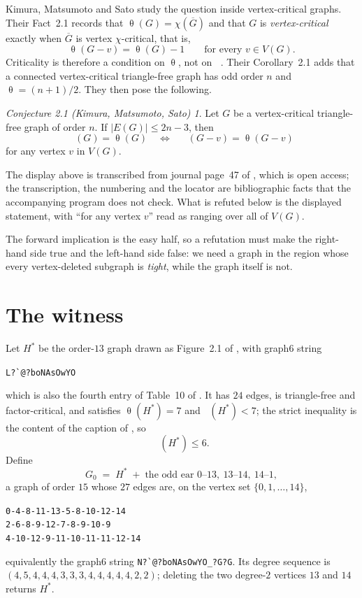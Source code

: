 \documentclass[11pt]{amsart}
\theoremstyle{remark}
\newtheorem*{conjKMS}{Conjecture 2.1 (Kimura, Matsumoto, Sato)}
\DeclareMathOperator{\edom}{\gamma^{\infty}}
\DeclareMathOperator{\thet}{\theta}
\newcommand{\Gz}{G_0}
\newcommand{\Hs}{H^{*}}
\begin{document}
Kimura, Matsumoto and Sato \cite{KMS} study the question inside vertex-critical graphs. Their
Fact~2.1 records that $\thet(G)=\chi(\overline G)$ and that $G$ is \emph{vertex-critical} exactly
when $\overline G$ is vertex $\chi$-critical, that is,
\begin{equation}\label{eq:crit}
  \thet(G-v)=\thet(G)-1\qquad\text{for every }v\in V(G).
\end{equation}
Criticality is therefore a condition on $\thet$, not on $\edom$. Their Corollary~2.1 adds that a
connected vertex-critical triangle-free graph has odd order $n$ and $\thet=(n+1)/2$. They then
pose the following.

\begin{conjKMS}
Let $G$ be a vertex-critical triangle-free graph of order $n$. If $|E(G)|\le 2n-3$, then
\[
  \edom(G)=\thet(G)
  \quad\Longleftrightarrow\quad
  \edom(G-v)=\thet(G-v)
\]
for any vertex $v$ in $V(G)$.
\end{conjKMS}

The display above is transcribed from journal page~47 of \cite{KMS}, which is open access; the
transcription, the numbering and the locator are bibliographic facts that the accompanying program
does not check. What is refuted below is the displayed statement, with ``for any vertex $v$'' read
as ranging over all of $V(G)$.

The forward implication is the easy half, so a refutation must make the right-hand side true and
the left-hand side false: we need a graph in the region whose every vertex-deleted subgraph is
\emph{tight}, while the graph itself is not.

\section{The witness}

Let $\Hs$ be the order-$13$ graph drawn as Figure~2.1 of \cite{KMS}, with graph6 string
\begin{center}\verb+L?`@?boNAsOwYO+\end{center}
which is also the fourth entry of Table~10 of \cite{MMV}. It has $24$ edges, is triangle-free and
factor-critical, and satisfies $\thet(\Hs)=7$ and $\edom(\Hs)<7$; the strict inequality is the
content of the caption of \cite[Figure 2.1]{KMS}, so
\begin{equation}\label{eq:seed}
  \edom(\Hs)\le 6 .
\end{equation}
Define
\[
  \Gz \;=\; \Hs \;+\; \text{the odd ear } 0\text{--}13,\ 13\text{--}14,\ 14\text{--}1 ,
\]
a graph of order $15$ whose $27$ edges are, on the vertex set $\{0,1,\dots,14\}$,
\begin{center}
\texttt{0-4-8-11-13-5-8-10-12-14}\\
\texttt{2-6-8-9-12-7-8-9-10-9}\\
\texttt{4-10-12-9-11-10-11-11-12-14}
\end{center}
equivalently the graph6 string \verb+N?`@?boNAsOwYO_?G?G+. Its degree sequence is
$(4,5,4,4,4,3,3,3,4,4,4,4,4,2,2)$; deleting the two degree-$2$ vertices $13$ and $14$ returns
$\Hs$.
\end{document}
